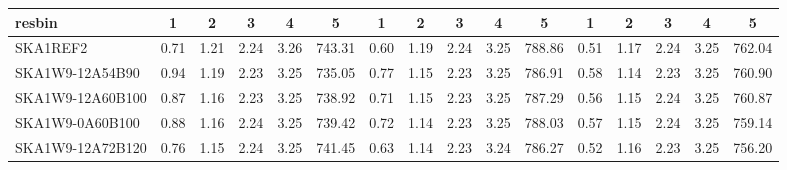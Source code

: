 \begin{table}[H]
{{\begin{tabular}{|lccccc||ccccc||ccccc|}
 resbin  &1 & 2 & 3 & 4 & 5 & 1 & 2 & 3 & 4 & 5 & 1 & 2 & 3 & 4 & 5 \\ \hline
SKA1REF2 & 0.71 \cellcolor{blue!19.71} & 1.21 \cellcolor{red!60.00} & 2.24 \cellcolor{green!48.46} & 3.26 \cellcolor{orange!60.00} & 743.31 \cellcolor{purple!60.00} & 0.60 \cellcolor{blue!18.00} & 1.19 \cellcolor{red!60.00} & 2.24 \cellcolor{green!60.00} & 3.25 \cellcolor{orange!36.07} & 788.86 \cellcolor{purple!60.00} & 0.51 \cellcolor{blue!25.52} & 1.17 \cellcolor{red!60.00} & 2.24 \cellcolor{green!51.25} & 3.25 \cellcolor{orange!32.46} & 762.04 \cellcolor{purple!59.29}\\ \hline 
SKA1W9-12A54B90 & 0.94 \cellcolor{blue!60.00} & 1.19 \cellcolor{red!51.73} & 2.23 \cellcolor{green!18.00} & 3.25 \cellcolor{orange!51.03} & 735.05 \cellcolor{purple!18.00} & 0.77 \cellcolor{blue!60.00} & 1.15 \cellcolor{red!25.70} & 2.23 \cellcolor{green!37.87} & 3.25 \cellcolor{orange!55.12} & 786.91 \cellcolor{purple!30.51} & 0.58 \cellcolor{blue!60.00} & 1.14 \cellcolor{red!18.00} & 2.23 \cellcolor{green!32.29} & 3.25 \cellcolor{orange!30.85} & 760.90 \cellcolor{purple!51.16}\\ \hline 
SKA1W9-12A60B100 & 0.87 \cellcolor{blue!46.73} & 1.16 \cellcolor{red!32.53} & 2.23 \cellcolor{green!23.13} & 3.25 \cellcolor{orange!43.96} & 738.92 \cellcolor{purple!37.67} & 0.71 \cellcolor{blue!45.91} & 1.15 \cellcolor{red!21.43} & 2.23 \cellcolor{green!49.61} & 3.25 \cellcolor{orange!60.00} & 787.29 \cellcolor{purple!36.28} & 0.56 \cellcolor{blue!48.33} & 1.15 \cellcolor{red!29.39} & 2.24 \cellcolor{green!47.17} & 3.25 \cellcolor{orange!26.49} & 760.87 \cellcolor{purple!50.98}\\ \hline 
SKA1W9-0A60B100 & 0.88 \cellcolor{blue!49.73} & 1.16 \cellcolor{red!32.93} & 2.24 \cellcolor{green!60.00} & 3.25 \cellcolor{orange!46.31} & 739.42 \cellcolor{purple!40.24} & 0.72 \cellcolor{blue!49.61} & 1.14 \cellcolor{red!20.87} & 2.23 \cellcolor{green!44.19} & 3.25 \cellcolor{orange!47.30} & 788.03 \cellcolor{purple!47.47} & 0.57 \cellcolor{blue!54.08} & 1.15 \cellcolor{red!33.07} & 2.24 \cellcolor{green!60.00} & 3.25 \cellcolor{orange!19.61} & 759.14 \cellcolor{purple!38.79}\\ \hline 
SKA1W9-12A72B120 & 0.76 \cellcolor{blue!28.09} & 1.15 \cellcolor{red!20.87} & 2.24 \cellcolor{green!48.14} & 3.25 \cellcolor{orange!49.38} & 741.45 \cellcolor{purple!50.58} & 0.63 \cellcolor{blue!26.01} & 1.14 \cellcolor{red!18.00} & 2.23 \cellcolor{green!24.77} & 3.24 \cellcolor{orange!27.28} & 786.27 \cellcolor{purple!20.84} & 0.52 \cellcolor{blue!29.78} & 1.16 \cellcolor{red!42.80} & 2.23 \cellcolor{green!18.00} & 3.25 \cellcolor{orange!18.00} & 756.20 \cellcolor{purple!18.00}\\ \hline 

\end{tabular}}}
\end{table}
